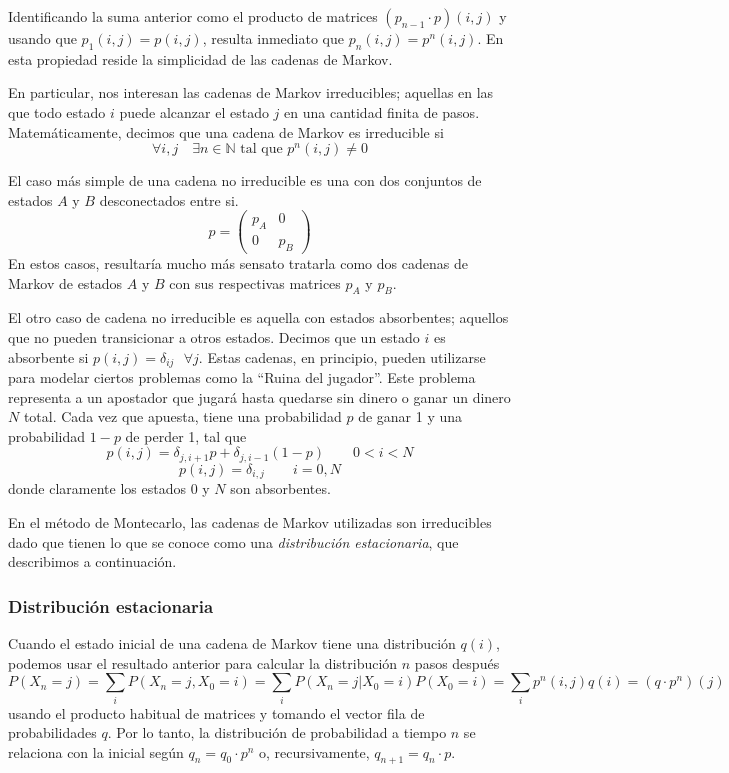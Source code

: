 Identificando la suma anterior como el producto de matrices $(p_{n-1} \cdot p)(i,j)$ y usando que $p_1(i,j)=p(i,j)$, resulta inmediato que $p_n(i,j) = p^n(i,j)$.
En esta propiedad reside la simplicidad de las cadenas de Markov.

En particular, nos interesan las cadenas de Markov irreducibles; aquellas en las que todo estado $i$ puede alcanzar el estado $j$ en una cantidad finita de pasos.
Matemáticamente, decimos que una cadena de Markov es irreducible si
\[ \forall i,j \quad \exists n\in \mathbb{N} \text{ tal que } p^n(i,j) \neq 0 \]

El caso más simple de una cadena no irreducible es una con dos conjuntos de estados $A$ y $B$ desconectados entre si.
\[ p =
\begin{pmatrix}
 p_A & 0\\
 0 & p_B
\end{pmatrix} \]
En estos casos, resultaría mucho más sensato tratarla como dos cadenas de Markov de estados $A$ y $B$ con sus respectivas matrices $p_A$ y $p_B$.

El otro caso de cadena no irreducible es aquella con estados absorbentes\cite[pp. 6]{BOOK:DURRET}; aquellos que no pueden transicionar a otros estados.
Decimos que un estado $i$ es absorbente si $p(i,j)=\delta_{ij} \text{ } \forall j$.
Estas cadenas, en principio, pueden utilizarse para modelar ciertos problemas como la ``Ruina del jugador''\cite[pp. 1]{BOOK:DURRET}. 
Este problema representa a un apostador que jugará hasta quedarse sin dinero o ganar un dinero $N$ total.
Cada vez que apuesta, tiene una probabilidad $p$ de ganar 1 y una probabilidad $1-p$ de perder 1, tal que
\[ p(i,j) = \delta_{j,i+1}p+\delta_{j,i-1}(1-p) \qquad 0<i<N \]
\[ p(i,j) = \delta_{i,j} \qquad i=0,N \]
donde claramente los estados $0$ y $N$ son absorbentes.

En el método de Montecarlo, las cadenas de Markov utilizadas son irreducibles dado que tienen lo que se conoce como una \textit{distribución estacionaria}, que describimos a continuación.

\subsubsection{Distribución estacionaria}

Cuando el estado inicial de una cadena de Markov tiene una distribución $q(i)$, podemos usar el resultado anterior para calcular la distribución $n$ pasos después
\[ P(X_n=j) = \sum_i P(X_n=j,X_0=i) =  \sum_i P(X_n=j|X_0=i)P(X_0=i) = \sum_i p^n(i,j)q(i) = (q\cdot p^n)(j)\]
usando el producto habitual de matrices y tomando el vector fila de probabilidades $q$.
Por lo tanto, la distribución de probabilidad a tiempo $n$ se relaciona con la inicial según $q_n = q_0\cdot p^n$ o, recursivamente, $q_{n+1} = q_n\cdot p$.

